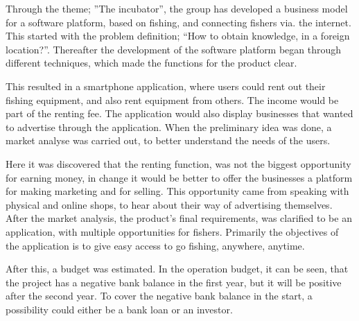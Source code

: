 \vspace{1cm}
\begin{center}
\begin{minipage}{0.5\textwidth}
Through the theme; ”The incubator”, the group has developed a business model for a software platform, based on fishing, and connecting fishers via. the internet. This started with the problem definition; “How to obtain knowledge, in a foreign location?”. 
Thereafter the development of the software platform began through different techniques, which made the functions for the product clear. 

This resulted in a smartphone application, where users could rent out their fishing equipment, and also rent equipment from others. The income would be part of the renting fee. The application would also display businesses that wanted to advertise through the application. When the preliminary idea was done, a market analyse was carried out, to better understand the needs of the users. 

Here it was discovered that the renting function, was not the biggest opportunity for earning money, in change it would be better to offer the businesses a platform for making marketing and for selling. This opportunity came from speaking with physical and online shops, to hear about their way of advertising themselves. After the market analysis, the product's final requirements, was clarified to be an application, with multiple opportunities for fishers. Primarily the objectives of the application is to give easy access to go fishing, anywhere, anytime.

After this, a budget was estimated. In the operation budget, it can be seen, that the project has a negative bank balance in the first year, but it will be positive after the second year. To cover the negative bank balance in the start, a possibility could either be a bank loan or an investor. 
\end{minipage}	
\end{center}
